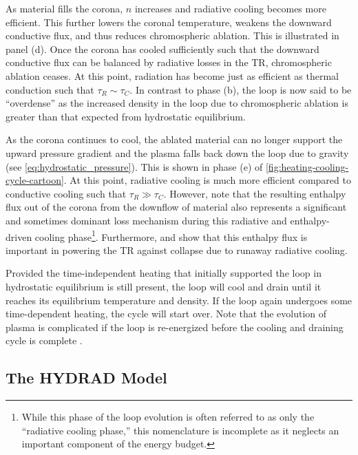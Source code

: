 As material fills the corona, $n$ increases and radiative cooling becomes more efficient. This further lowers the coronal temperature, weakens the downward conductive flux, and thus reduces chromospheric ablation. This is illustrated in panel (d). Once the corona has cooled sufficiently such that the downward conductive flux can be balanced by radiative losses in the TR, chromospheric ablation ceases. At this point, radiation has become just as efficient as thermal conduction such that $\tau_R\sim\tau_C$. In contrast to phase (b), the loop is now said to be ``overdense'' as the increased density in the loop due to chromospheric ablation is greater than that expected from hydrostatic equilibrium.

As the corona continues to cool, the ablated material can no longer support the upward pressure gradient and the plasma falls back down the loop due to gravity (see \autoref{eq:hydrostatic_pressure}). This is shown in phase (e) of \autoref{fig:heating-cooling-cycle-cartoon}. At this point, radiative cooling is much more efficient compared to conductive cooling such that $\tau_R\gg\tau_C$. However, \citep{bradshaw_cooling_2010} note that the resulting enthalpy flux out of the corona from the downflow of material also represents a significant and sometimes dominant loss mechanism during this radiative and enthalpy-driven cooling phase\footnote{While this phase of the loop evolution is often referred to as only the ``radiative cooling phase,'' this nomenclature is incomplete as it neglects an important component of the energy budget.}. Furthermore, \citet{bradshaw_reinterpretation_2008} and \citet{bradshaw_cooling_2010} show that this enthalpy flux is important in powering the TR against collapse due to runaway radiative cooling.

Provided the time-independent heating that initially supported the loop in hydrostatic equilibrium is still present, the loop will cool and drain until it reaches its equilibrium temperature and density. If the loop again undergoes some time-dependent heating, the cycle will start over. Note that the evolution of plasma is complicated if the loop is re-energized before the cooling and draining cycle is complete \citep[e.g.][and see \autoref{sec:modeling-observables:heating}]{cargill_active_2014,barnes_inference_2016-1}.

\subsection{The HYDRAD Model}\label{sec:hydrad}

